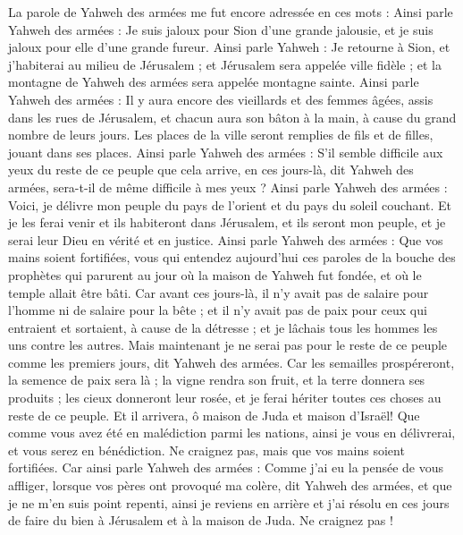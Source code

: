 \begin{multicols}{2}
\VerseOne{}La parole de Yahweh des armées me fut encore adressée en ces mots :
Ainsi parle Yahweh des armées : Je suis jaloux pour Sion d'une grande jalousie, et je suis jaloux pour elle d'une grande fureur.
Ainsi parle Yahweh : Je retourne à Sion, et j'habiterai au milieu de Jérusalem ; et Jérusalem sera appelée ville fidèle ; et la montagne de Yahweh des armées sera appelée montagne sainte.
Ainsi parle Yahweh des armées : Il y aura encore des vieillards et des femmes âgées, assis dans les rues de Jérusalem, et chacun aura son bâton à la main, à cause du grand nombre de leurs jours.
Les places de la ville seront remplies de fils et de filles, jouant dans ses places.
Ainsi parle Yahweh des armées : S'il semble difficile aux yeux du reste de ce peuple que cela arrive, en ces jours-là, dit Yahweh des armées, sera-t-il de même difficile à mes yeux ?
Ainsi parle Yahweh des armées : Voici, je délivre mon peuple du pays de l'orient et du pays du soleil couchant.
Et je les ferai venir et ils habiteront dans Jérusalem, et ils seront mon peuple, et je serai leur Dieu en vérité et en justice.
Ainsi parle Yahweh des armées : Que vos mains soient fortifiées, vous qui entendez aujourd'hui ces paroles de la bouche des prophètes qui parurent au jour où la maison de Yahweh fut fondée, et où le temple allait être bâti.
Car avant ces jours-là, il n'y avait pas de salaire pour l'homme ni de salaire pour la bête ; et il n'y avait pas de paix pour ceux qui entraient et sortaient, à cause de la détresse ; et je lâchais tous les hommes les uns contre les autres.
Mais maintenant je ne serai pas pour le reste de ce peuple comme les premiers jours, dit Yahweh des armées.
Car les semailles prospéreront, la semence de paix sera là ; la vigne rendra son fruit, et la terre donnera ses produits ; les cieux donneront leur rosée, et je ferai hériter toutes ces choses au reste de ce peuple.
Et il arrivera, ô maison de Juda et maison d'Israël! Que comme vous avez été en malédiction parmi les nations, ainsi je vous en délivrerai, et vous serez en bénédiction. Ne craignez pas, mais que vos mains soient fortifiées.
Car ainsi parle Yahweh des armées : Comme j'ai eu la pensée de vous affliger, lorsque vos pères ont provoqué ma colère, dit Yahweh des armées, et que je ne m'en suis point repenti,
ainsi je reviens en arrière et j'ai résolu en ces jours de faire du bien à Jérusalem et à la maison de Juda. Ne craignez pas !

\end{multicols}
